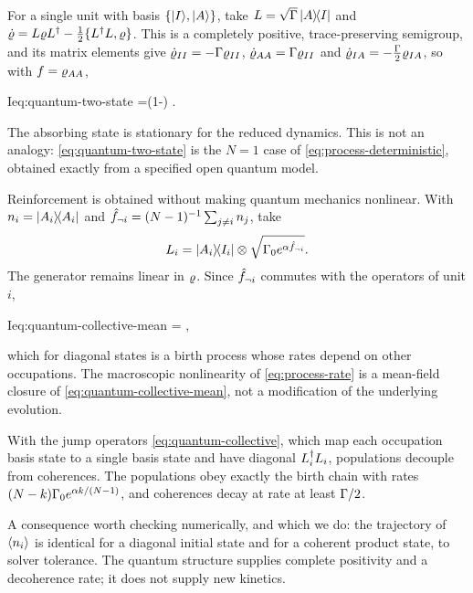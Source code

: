 For a single unit with basis $\{\lvert I \rangle,\lvert A \rangle\}$, take
$L=\sqrt{\Gamma}\,\lvert A \rangle\!\langle I \rvert$ and
$\dot{\varrho}=L\varrho L^{\dagger}-\tfrac12\{L^{\dagger}L,\varrho\}$.
This is a completely positive, trace-preserving semigroup, and its matrix
elements give $\dot{\varrho}_{II}=-\Gamma\varrho_{II}$,
$\dot{\varrho}_{AA}=\Gamma\varrho_{II}$ and
$\dot{\varrho}_{IA}=-\tfrac{\Gamma}{2}\varrho_{IA}$, so with $f=\varrho_{AA}$,
%
\begin{keyresult}{I}{eq:quantum-two-state}
  \dot \fconv=\Gam(1-\fconv) .
\end{keyresult}
%
The absorbing state is stationary for the reduced dynamics. This is not an
analogy: \cref{eq:quantum-two-state} is the $N=1$ case of
\cref{eq:process-deterministic}, obtained exactly from a specified open
quantum model.

Reinforcement is obtained without making quantum mechanics nonlinear. With
$n_i=\lvert A_i \rangle\!\langle A_i \rvert$ and
$\hat {f}_{\neg i}=(N-1)^{-1}\sum_{j\neq i}n_j$, take
%
\begin{equation}\label{eq:quantum-collective}
  L_i=\lvert A_i \rangle\!\langle I_i \rvert\otimes\sqrt{\Gamma_{0} e^{\alpha \hat {f}_{\neg i}}} .
\end{equation}
%
The generator remains linear in $\varrho$. Since $\hat {f}_{\neg i}$ commutes
with the operators of unit $i$,
%
\begin{keyresult}{I}{eq:quantum-collective-mean}
  = ,
\end{keyresult}
%
which for diagonal states is a birth process whose rates depend on other
occupations. The macroscopic nonlinearity of \cref{eq:process-rate} is a
mean-field closure of \cref{eq:quantum-collective-mean}, not a modification of
the underlying evolution.

\begin{proposition}\label{prop:classical-reduction}
  With the jump operators \cref{eq:quantum-collective}, which map each
  occupation basis state to a single basis state and have diagonal
  $L_i^{\dagger}L_i$, populations decouple from coherences. The
  populations obey exactly the birth chain with rates
  $(N-k)\Gamma_{0} e^{\alpha k/(N-1)}$, and coherences decay at rate at least
  $\Gamma/2$.
\end{proposition}

A consequence worth checking numerically, and which we do: the trajectory of
$\left\langle n_i \right\rangle$ is identical for a diagonal initial state and for a coherent
product state, to solver tolerance. The quantum structure supplies complete
positivity and a decoherence rate; it does not supply new kinetics.

